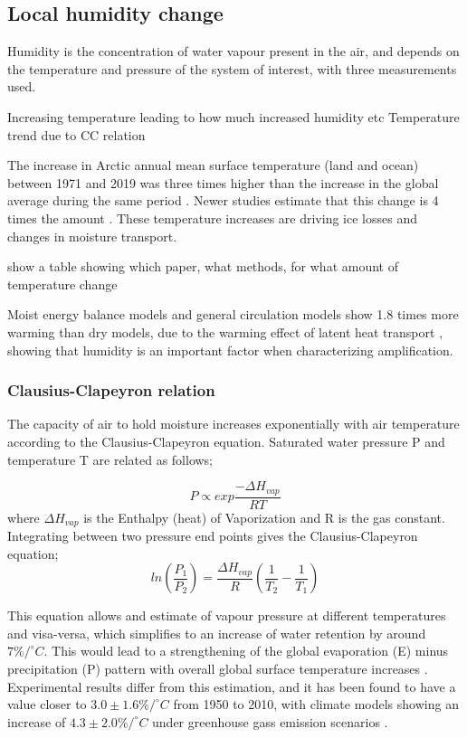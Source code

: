 \documentclass[11pt, oneside]{article}
\begin{document}
\subsection{Local humidity change}

Humidity is the concentration of water vapour present in the air, and depends on the temperature and pressure of the system of interest, with three measurements used. 



Increasing temperature leading to how much increased humidity etc 
Temperature trend due to CC relation 

The increase in Arctic annual mean surface temperature (land and ocean) between 1971 and 2019 was three times higher than the increase in the global average during the same period \cite{AMAP}. Newer studies estimate that this change is 4 times the amount \cite{rantanen2022arctic}. These temperature increases are driving ice losses and changes in moisture transport.

show a table showing which paper, what methods, for what amount of temperature change

Moist energy balance models and general circulation models show 1.8 times more warming than dry models, due to the warming effect of latent heat transport \cite{feldl2021polar}, showing that humidity is an important factor when characterizing amplification.


\subsubsection{Clausius-Clapeyron relation}\label{cc}
The capacity of air to hold moisture increases exponentially with air temperature according to the Clausius-Clapeyron equation. Saturated water pressure P and temperature T are related as follows;

\begin{equation}
    P \propto exp\frac{-\Delta H_{vap}}{RT}
\end{equation}
where $\Delta H_{vap}$  is the Enthalpy (heat) of Vaporization and R is the gas constant. Integrating between two pressure end points gives the Clausius-Clapeyron equation;  
\begin{equation}
    ln \left ( \frac{P_1}{P_2} \right ) = \frac{\Delta H_{vap}}{R} \left ( \frac{1}{T_2} - \frac{1}{T_1} \right )
\end{equation}

This equation allows and estimate of vapour pressure at different temperatures and visa-versa, which simplifies to an increase of water retention by around $7\% / ^{\circ} C $. This would lead to a strengthening of the global evaporation (E) minus precipitation (P) pattern with overall global surface temperature increases \cite{held2006robust}. Experimental results differ from this estimation, and it has been found to have a value closer to $3.0 \pm 1.6 \% / ^{\circ} C $ from 1950 to 2010, with climate models showing an increase of $4.3 \pm 2.0 \% / ^{\circ} C $ under greenhouse gass emission scenarios \cite{Skliris2016}. 
\end{document}
